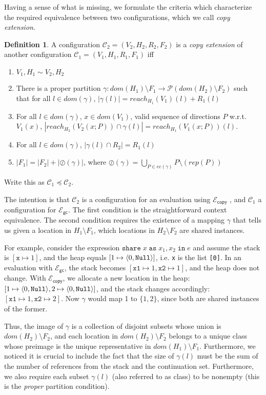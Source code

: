 \documentclass{easychair}
\newcommand{\ms}[1]{\ensuremath{\mathsf{#1}}}
\newcommand{\irl}[1]{\mathtt{#1}}
\newcommand{\sharecst}[4]{\irl{share}\;#1\;\irl{as}\;#2,#3\;\irl{in}\;#4}
\newcommand{\oh}[1]{\oslash(#1)}
\newcommand{\gcSem}{\ensuremath{\mathcal{E}_{\ms{gc}}}}
\newcommand{\copySem}{\ensuremath{\mathcal{E}_{\ms{copy}}}}
\theoremstyle{definition}
\newtheorem{definition}{Definition}
\begin{document}
Having a sense of what is missing, we formulate the
criteria which characterize the required equivalence between two configurations,
which we call \emph{copy extension}.
\begin{definition}
  A configuration $\mathcal{C}_2 = (V_2,H_2,R_2,F_2)$ is a \emph{copy extension} of
  another configuration
$\mathcal{C}_1 = (V_1,H_1,R_1,F_1)$ iff
\begin{enumerate}
\item $V_1,H_1 \sim V_2,H_2$
\item There is a proper partition $\gamma : dom(H_1) \setminus F_1 \to \mathcal{P}(dom(H_2) \setminus F_2)$ 
such that for all $l \in dom(\gamma)$, $|\gamma(l)| = reach_{H_1}(V_1)(l) + R_1(l)$
\item For all $l \in dom(\gamma)$, $x \in dom(V_1)$, valid sequence of directions $P$ w.r.t. $V_1(x)$,
	$|reach_{H_2}(V_2(x;P)) \cap \gamma(l)| = reach_{H_1}(V_1(x;P))(l)$.
\item	For all $l \in dom(\gamma)$, $|\gamma(l) \cap R_2| = R_1(l)$
\item $|F_1| = |F_2| + |\oh{\gamma}|$, where 
	$\oh{\gamma} = \bigcup_{P \in ec(\gamma)} P \setminus (rep(P))$
\end{enumerate}
Write this as $\mathcal{C}_1 \preceq \mathcal{C}_2$.
\end{definition} 

The intention is that $\mathcal{C}_2$ is a configuration for an evaluation using \copySem
, and $\mathcal{C}_1$ a configuration for \gcSem. 
%
The first condition is the straightforward context equivalence.
The second condition requires the existence of 
a mapping $\gamma$ that tells us given a location in $H_1 \setminus F_1$, which locations in 
$H_2 \setminus F_2$ are shared instances.

For example, consider the expression $\sharecst{x}{x_1}{x_2}{e}$ and
assume the stack is $[\texttt{x} \mapsto 1]$, and the heap equals 
$[1 \mapsto \pairexcst{0}{\irl{Null}}]$, i.e. \texttt{x} is the list \texttt{[0]}.
In an evaluation with \gcSem{}, the stack becomes 
$[\texttt{x1} \mapsto 1,\texttt{x2} \mapsto 1]$, and the heap does not change. With 
\copySem, we allocate a new location in the heap:
$[1 \mapsto \pairexcst{0}{\irl{Null}},2 \mapsto \pairexcst{0}{\irl{Null}}]$, and the 
stack changes accordingly: $[\texttt{x1} \mapsto 1,\texttt{x2} \mapsto 2]$.
Now $\gamma$ would map 1 to $\{1,2\}$, since both are shared instances of the former.

Thus, the image of $\gamma$ is a collection of disjoint subsets whose union is $dom(H_2) \setminus F_2$,
and each location in $dom(H_2) \setminus F_2$ belongs to a unique class whose preimage is the  
unique representative in $dom(H_1) \setminus F_1$. Furthermore, we noticed it is crucial to include the 
fact that the size of $\gamma(l)$ must be the sum of the number of references from the stack and 
the continuation set. Furthermore, we also require each subset $\gamma(l)$ (also referred to as class)
to be nonempty (this is the \emph{proper} partition condition).
\end{document}
